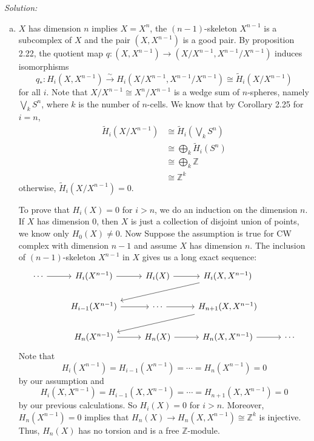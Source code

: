 \documentclass[a4paper, 12pt]{article}
\newenvironment{solution}
    {\textit{Solution:}}
    {}
\begin{document}
\begin{solution}
\begin{enumerate}[(a)]
	\item \(X\) has dimension \(n\) implies \(X=X^n\), the \((n-1)\)-skeleton \(X^{n-1}\) is a subcomplex of \(X\) and the pair \((X,X^{n-1})\) is a good pair. By proposition 2.22, the quotient map 
	      \(q:(X,X^{n-1})\rightarrow (X/X^{n-1},X^{n-1}/X^{n-1})\) induces isomorphisms 
		  \[q_*:H_i(X,X^{n-1})\xrightarrow{\sim} H_i(X/X^{n-1},X^{n-1}/X^{n-1})\cong \tilde{H}_i(X/X^{n-1})\] 
		  for all \(i\). Note that \(X/X^{n-1}\cong X^n/X^{n-1}\) is a wedge sum of \(n\)-spheres, namely \(\bigvee_k S^n\), where \(k\) is the number of \(n\)-cells. We know that  by Corollary 2.25 for \(i=n\), 
		  \begin{align*}
			\tilde{H}_i(X/X^{n-1}) & \cong \tilde{H}_i(\bigvee_k S^n)\\ 
			                       & \cong \bigoplus_k \tilde{H}_i(S^n)\\ 
								   & \cong \bigoplus_k \mathbb{Z}\\ 
								   & \cong \mathbb{Z}^k
		  \end{align*}
		  otherwise, \(\tilde{H}_i(X/X^{n-1})=0\). 
		  \par 
		  To prove that \(H_i(X)=0\) for \(i>n\), we do an induction on the dimension \(n\). If \(X\) has dimension \(0\), then \(X\) is just a collection of disjoint union of points, we know only \(H_0(X)\neq 0\). Now Suppose 
		  the assumption is true for CW complex with dimension \(n-1\) and assume \(X\) has dimension \(n\). The inclusion of \((n-1)\)-skeleton \(X^{n-1}\) in \(X\) gives us a long exact sequence:
\[\begin{tikzcd}
	\cdots & {H_i(X^{n-1})} & {H_i(X)} & {H_i(X,X^{n-1})} \\
	& {H_{i-1}(X^{n-1})} & \cdots & {H_{n+1}(X,X^{n-1})} \\
	& {H_n(X^{n-1})} & {H_n(X)} & {H_n(X,X^{n-1})} & \cdots
	\arrow[from=1-1, to=1-2]
	\arrow[from=1-2, to=1-3]
	\arrow[from=1-3, to=1-4]
	\arrow[from=1-4, to=2-2]
	\arrow[from=2-2, to=2-3]
	\arrow[from=2-3, to=2-4]
	\arrow[from=2-4, to=3-2]
	\arrow[from=3-2, to=3-3]
	\arrow[from=3-3, to=3-4]
	\arrow[from=3-4, to=3-5]
\end{tikzcd}\]
Note that 
\[H_i(X^{n-1})=H_{i-1}(X^{n-1})=\cdots=H_n(X^{n-1})=0\]
by our assumption and 
\[H_i(X,X^{n-1})=H_{i-1}(X,X^{n-1})=\cdots=H_{n+1}(X,X^{n-1})=0\]
by our previous calculations. So \(H_i(X)=0\) for \(i>n\). Moreover, \(H_n(X^{n-1})=0\) implies that \(H_n(X)\rightarrow H_n(X,X^{n-1})\cong \mathbb{Z}^k\) is injective. Thus, \(H_n(X)\) has no torsion and is a free \(\mathbb{Z}\)-module.

\end{enumerate}
\end{solution}
\end{document}
